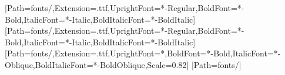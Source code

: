 \usepackage{fontspec}
\setmainfont{Carlito}[Path=fonts/,Extension=.ttf,UprightFont=*-Regular,BoldFont=*-Bold,ItalicFont=*-Italic,BoldItalicFont=*-BoldItalic]
\setsansfont{Carlito}[Path=fonts/,Extension=.ttf,UprightFont=*-Regular,BoldFont=*-Bold,ItalicFont=*-Italic,BoldItalicFont=*-BoldItalic]
\setmonofont{DejaVuSansMono}[Path=fonts/,Extension=.ttf,UprightFont=*,BoldFont=*-Bold,ItalicFont=*-Oblique,BoldItalicFont=*-BoldOblique,Scale=0.82]
\newfontfamily{}[Path=fonts/]

